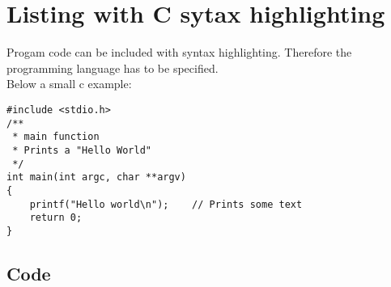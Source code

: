 \section{Listing with C sytax highlighting}
Progam code can be included with syntax highlighting. Therefore the 
programming language has to be specified. \\
Below a small c example: 
\begin{lstlisting}
#include <stdio.h>
/**
 * main function
 * Prints a "Hello World"
 */
int main(int argc, char **argv)
{
    printf("Hello world\n");    // Prints some text
    return 0;
}
\end{lstlisting}

\subsection{Code}

